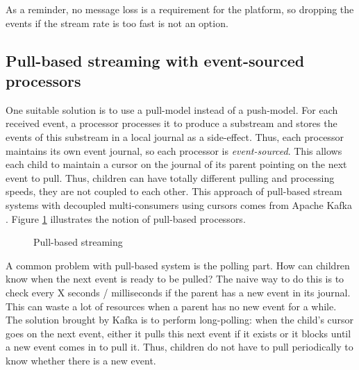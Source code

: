 As a reminder, no message loss is a requirement for the platform, so dropping the events if the stream rate is too fast is not an option.
\\

\subsection{Pull-based streaming with event-sourced processors}

One suitable solution is to use a pull-model instead of a push-model. For each received event, a processor processes it to produce a substream and stores the events of this substream in a local journal as a side-effect. Thus, each processor maintains its own event journal, so each processor is \textit{event-sourced}.
This allows each child to maintain a cursor on the journal of its parent pointing on the next event to pull. Thus, children can have totally different pulling and processing speeds, they are not coupled to each other. This approach of pull-based stream systems with decoupled multi-consumers using cursors comes from Apache Kafka . 
Figure \ref{fig:pull_processors} illustrates the notion of pull-based processors.

\begin{figure}[h]
  \begin{center} 
    \caption{Pull-based streaming}
    \label{fig:pull_processors}
  \end{center}
\end{figure}

A common problem with pull-based system is the polling part. How can children know when the next event is ready to be pulled? The naive way to do this is to check every X seconds / milliseconds if the parent has a new event in its journal. This can waste a lot of resources when a parent has no new event for a while. The solution brought by Kafka is to 
perform long-polling: when the child's cursor goes on the next event, either it pulls this next event if it exists or it blocks until a new event comes in to pull it. Thus, children do not have to pull periodically to know whether there is a new event.

